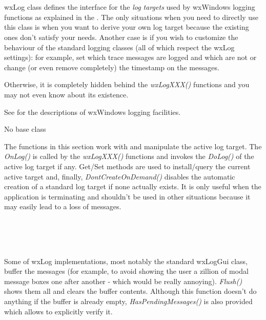 \section{}\label{wxlog}

wxLog class defines the interface for the {\it log targets} used by wxWindows
logging functions as explained in the .
The only situations when you need to directly use this class is when you want
to derive your own log target because the existing ones don't satisfy your
needs. Another case is if you wish to customize the behaviour of the standard
logging classes (all of which respect the wxLog settings): for example, set
which trace messages are logged and which are not or change (or even remove
completely) the timestamp on the messages.

Otherwise, it is completely hidden behind the {\it wxLogXXX()} functions and
you may not even know about its existence.

See  for the descriptions of wxWindows
logging facilities.


No base class



The functions in this section work with and manipulate the active log target.
The {\it OnLog()} is called by the {\it wxLogXXX()} functions and invokes the
{\it DoLog()} of the active log target if any. Get/Set methods are used to
install/query the current active target and, finally, {\it
DontCreateOnDemand()} disables the automatic creation of a standard log target
if none actually exists. It is only useful when the application is terminating
and shouldn't be used in other situations because it may easily lead to a loss
of messages.

\\
\\
\\


Some of wxLog implementations, most notably the standard
wxLogGui class, buffer the messages (for example, to avoid
showing the user a zillion of modal message boxes one after another - which
would be really annoying). {\it Flush()} shows them all and clears the buffer
contents. Although this function doesn't do anything if the buffer is already
empty, {\it HasPendingMessages()} is also provided which allows to explicitly
verify it.


